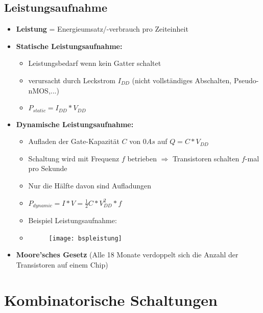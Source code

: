 \subsection{Leistungsaufnahme}
\begin{itemize}
\item \textbf{Leistung} = Energieumsatz/-verbrauch pro Zeiteinheit

\item \textbf{Statische Leistungsaufnahme:} 
	\begin{itemize}
	\item Leistungsbedarf wenn kein Gatter schaltet
	\item verursacht durch Leckstrom $I_{DD}$ (nicht vollständiges Abschalten, Pseudo-nMOS,...)
	\item $P_{static} = I_{DD} * V_{DD}$
	\end{itemize}

\item \textbf{Dynamische Leistungsaufnahme:} 
	\begin{itemize}
	\item Aufladen der Gate-Kapazität $C$ von $0 As$ auf $Q = C * V_{DD}$
	\item Schaltung wird mit Frequenz $f$ betrieben $\Rightarrow$ Transistoren schalten $f$-mal pro Sekunde
	\item Nur die Hälfte davon sind Aufladungen
	\item $P_{dynamic} = I * V = \frac{1}{2} C*V_{DD}^2*f$
	\item Beispiel Leistungsaufnahme:
	\item[]	\vspace{-0.35cm}
			\begin{figure}[H]
				\begin{center}
				\texttt{[image: bspleistung]}
				\end{center}
			\end{figure}
	\end{itemize}
	
\item \textbf{Moore'sches Gesetz} (Alle 18 Monate verdoppelt sich die Anzahl der Transistoren auf einem Chip)
	
	
\end{itemize}

\section{Kombinatorische Schaltungen}
